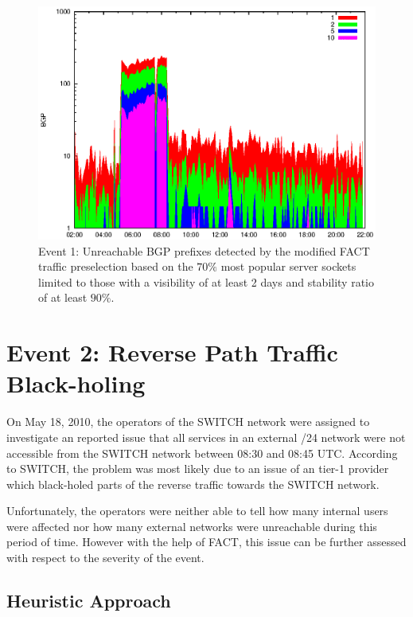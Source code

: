 \begin{figure}
	[p] \centering 
	\includegraphics[width=0.75\linewidth]{images/events/2010_03_25/bgp_log_Set_var_0_1_stab_9_vts_2.eps} \caption{Event 1: Unreachable BGP prefixes detected by the modified FACT traffic preselection based on the $70\%$ most popular server sockets limited to those with a visibility of at least 2 days and stability ratio of at least $90\%$.} 
	\label{fig:AMS_IX_FACT_popularVTS2STAB9} 
\end{figure}

\newpage 
\section{Event 2: Reverse Path Traffic Black-holing}

On May 18, 2010, the operators of the SWITCH network were assigned to investigate an reported issue that all services in an external /24 network were not accessible from the SWITCH network between 08:30 and 08:45 UTC. According to SWITCH, the problem was most likely due to an issue of an tier-1 provider which black-holed parts of the reverse traffic towards the SWITCH network\citep{SchatzmannPAM2011}.

Unfortunately, the operators were neither able to tell how many internal users were affected nor how many external networks were unreachable during this period of time. However with the help of FACT, this issue can be further assessed with respect to the severity of the event\citep{SchatzmannPAM2011}.

\subsection{Heuristic Approach}

